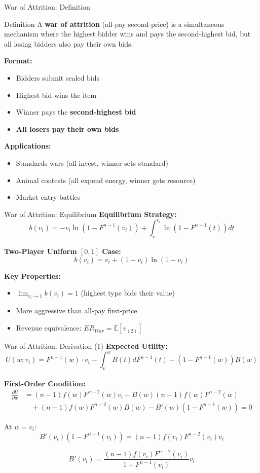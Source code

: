 \documentclass[xcolor={x11names}, aspectratio=169 ]{beamer}
\newcommand{\E}{\mathbb{E}}
\begin{document}
\begin{frame}{War of Attrition: Definition}
\begin{block}{Definition}
A \textbf{war of attrition} (all-pay second-price) is a simultaneous mechanism where the highest bidder wins and pays the second-highest bid, but all losing bidders also pay their own bids.
\end{block}

\textbf{Format:}
\begin{itemize}
\item Bidders submit sealed bids
\item Highest bid wins the item
\item Winner pays the \textbf{second-highest bid}
\item \textbf{All losers pay their own bids}
\end{itemize}

\textbf{Applications:}
\begin{itemize}
  \item Standards wars (all invest, winner sets standard)
  \item Animal contests (all expend energy, winner gets resource)
  \item Market entry battles
\end{itemize}
\end{frame}

\begin{frame}{War of Attrition: Equilibrium}
\textbf{Equilibrium Strategy:}
$$b(v_i) = -v_i \ln(1 - F^{n-1}(v_i)) + \int_{\underline{v}}^{v_i} \ln(1 - F^{n-1}(t))dt$$

\textbf{Two-Player Uniform $[0,1]$ Case:}
$$\boxed{b(v_i) = v_i + (1-v_i)\ln(1-v_i)}$$

\textbf{Key Properties:}
\begin{itemize}
  \item $\lim_{v_i \to 1} b(v_i) = 1$ (highest type bids their value)
  \item More aggressive than all-pay first-price
  \item Revenue equivalence: $ER_{War} = \E[v_{(2)}]$
\end{itemize}
\end{frame}

\begin{frame}{War of Attrition: Derivation (1)}
\textbf{Expected Utility:}
$$U(w; v_i) = F^{n-1}(w) \cdot v_i - \int_{\underline{v}}^w B(t) dF^{n-1}(t) - (1-F^{n-1}(w))B(w)$$

\textbf{First-Order Condition:}
\begin{align*}
\frac{\partial U}{\partial w} &= (n-1)f(w)F^{n-2}(w)v_i - B(w)(n-1)f(w)F^{n-2}(w) \\
&\quad + (n-1)f(w)F^{n-2}(w)B(w) - B'(w)(1-F^{n-1}(w)) = 0
\end{align*}

At $w = v_i$:
$$B'(v_i)(1-F^{n-1}(v_i)) = (n-1)f(v_i)F^{n-2}(v_i)v_i$$

$$B'(v_i) = \frac{(n-1)f(v_i)F^{n-2}(v_i)}{1-F^{n-1}(v_i)} v_i$$
\end{frame}
\end{document}
